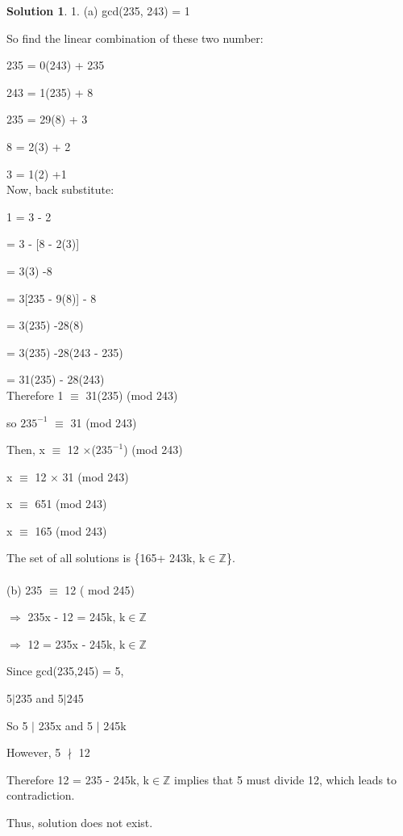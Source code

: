 \documentclass{article}
\theoremstyle{definition}
\newtheorem*{solution}{Solution}
\begin{document}
\begin{solution}

1. (a) gcd(235, 243) = 1

So find the linear combination of these two number:

235 = 0(243) + 235

243 = 1(235) + 8

235 = 29(8) + 3

8 = 2(3) + 2

3 = 1(2) +1\\

Now, back substitute:

1 = 3 - 2

= 3 - [8 - 2(3)]

= 3(3) -8

= 3[235 - 9(8)] - 8

= 3(235) -28(8)

= 3(235) -28(243 - 235)

= 31(235) - 28(243)\\

Therefore 1 \(\equiv\) 31(235) (mod 243)

so \(235^{-1}\) \(\equiv\) 31 (mod 243)

Then, x \(\equiv\) 12 \(\times\)(\(235^{-1}\)) (mod 243)

x \(\equiv\) 12 \(\times\) 31 (mod 243)

x \(\equiv\) 651 (mod 243)

x \(\equiv\) 165 (mod 243)

The set of all solutions is \{165+ 243k, k\(\in\)\(\mathbb{Z}\)\}.\\\\


(b) 235 \(\equiv\) 12 ( mod 245)

\(\Rightarrow\) 235x - 12 = 245k, k\(\in\)\(\mathbb{Z}\)

\(\Rightarrow\) 12 = 235x - 245k, k\(\in\)\(\mathbb{Z}\)

Since gcd(235,245) = 5,

5\(|\)235 and 5\(|\)245

So 5 \(|\) 235x and 5 \(|\) 245k

However, 5 \(\nmid\) 12

Therefore 12 = 235 - 245k, k\(\in\)\(\mathbb{Z}\) implies that 5 must divide 12, which leads to contradiction.

Thus, solution does not exist.\\\\



\end{solution}
\end{document}
